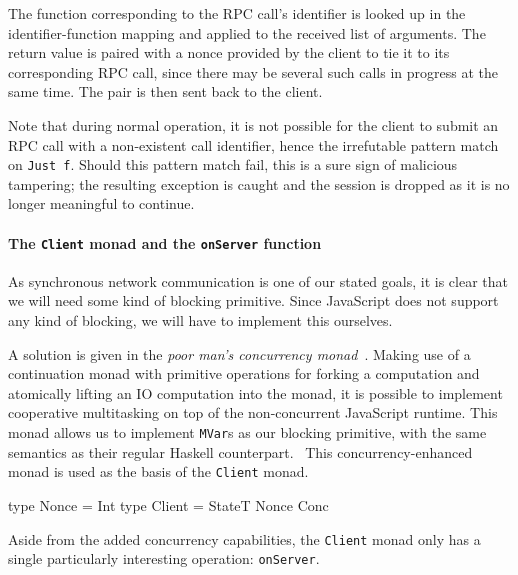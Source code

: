 \documentclass[preprint]{sigplanconf}
\begin{document}
The function corresponding to the RPC call's identifier is looked up in the
identifier-function mapping and applied to the received list of arguments.
The return value is paired with a nonce provided by the client to tie it to
its corresponding RPC call, since there may be several such calls in progress
at the same time. The pair is then sent back to the client.

Note that during normal operation, it is not possible for the client to submit
an RPC call with a non-existent call identifier, hence the irrefutable pattern
match on \lstinline!Just f!. Should this pattern match fail, this is a sure
sign of malicious tampering; the resulting exception is caught and the session
is dropped as it is no longer meaningful to continue.

\paragraph{The \lstinline!Client! monad and the \lstinline!onServer! function}
As synchronous network communication is one of our stated goals, it is clear
that we will need some kind of blocking primitive. Since JavaScript does not
support any kind of blocking, we will have to implement this ourselves.

A solution is given in the \emph{poor man's concurrency
monad}\ \cite{concurrencymonad}. Making use of a continuation monad with
primitive operations for forking a computation and atomically lifting an IO
computation into the monad, it is possible to implement cooperative
multitasking on top of the non-concurrent JavaScript runtime. This monad
allows us to implement \lstinline!MVar!s as our blocking primitive, with the
same semantics as their regular Haskell counterpart.\ \cite{ffi}
This concurrency-enhanced monad is used as the basis of the \lstinline!Client!
monad.

\begin{code}
type Nonce = Int
type Client = StateT Nonce Conc
\end{code}

Aside from the added concurrency capabilities, the \lstinline!Client! monad
only has a single particularly interesting operation: \lstinline!onServer!.

\end{document}
